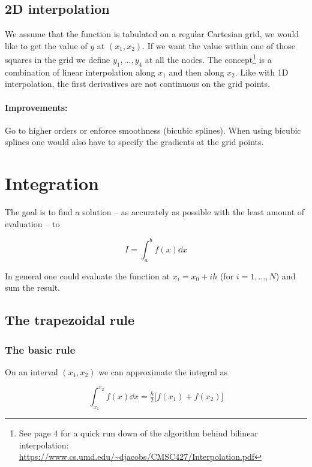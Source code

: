 \documentclass[a4paper]{article}
\begin{document}
\subsection{2D interpolation}

We assume that the function is tabulated on a regular Cartesian grid, we would like to get the value of $y$ at $(x_1, x_2)$. If we want the value within one of those squares in the grid we define $y_1, \dots, y_4$ at all the nodes. The concept\footnote{See page 4 for a quick run down of the algorithm behind bilinear interpolation: \url{https://www.cs.umd.edu/~djacobs/CMSC427/Interpolation.pdf}} is a combination of linear interpolation along $x_1$ and then along $x_2$. Like with 1D interpolation, the first derivatives are not continuous on the grid points.

\paragraph{Improvements:} Go to higher orders or enforce smoothness (bicubic splines). When using bicubic splines one would also have to specify the gradients at the grid points.

\section{Integration}

The goal is to find a solution -- as accurately as possible with the least amount of evaluation -- to

\begin{equation*}
    I=\int_a^b f(x)\dd{x}
\end{equation*}

In general one could evaluate the function at $x_i=x_0+ih$ (for $i=1,\dots,N$) and sum the result.

\subsection{The trapezoidal rule}

\subsubsection{The basic rule}

On an interval $(x_1, x_2)$ we can approximate the integral as

\begin{equation*}
    \int_{x_1}^{x_2}f(x)\dd{x}=\tfrac{h}{2}\big[f(x_1)+f(x_2)\big]
\end{equation*}
\end{document}

